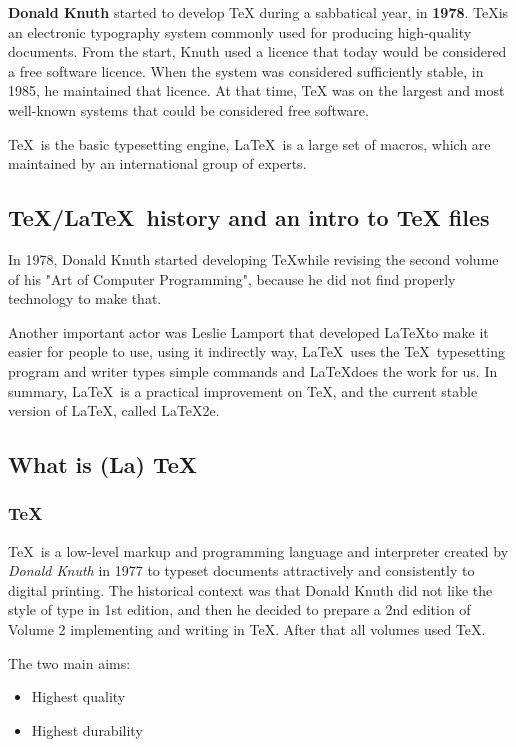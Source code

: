 \documentclass[11pt]{article}
\begin{document}
\textbf{Donald Knuth} started to develop TeX during a sabbatical year, in \textbf{1978}. \TeX is an electronic typography system commonly used for producing high-quality documents. From the start, Knuth used a licence that today would be considered a free software licence. When the system was considered sufficiently stable, in 1985, he maintained that licence. At that time, TeX was on the largest and most well-known systems that could be considered free software.

\TeX\ is the basic typesetting engine, \LaTeX\ is a large set of macros, which are maintained by an international group of experts.

\subsection{\TeX/\LaTeX\ history and an intro to TeX files}
In 1978, Donald Knuth started developing \TeX while revising the second volume of his "Art of Computer Programming", because he did not find properly technology to make that.

Another important actor was Leslie Lamport that developed \LaTeX to make it easier for people to use, using it indirectly way, \LaTeX\ uses the \TeX\ typesetting program and writer types simple commands and \LaTeX does the work for us. In summary, \LaTeX\ is a practical improvement on \TeX, and the current stable version of \LaTeX, called \LaTeX2e.

\subsection{What is (La) \TeX\ }
\subsubsection{\TeX\ }
\TeX\ is a low-level markup and programming language and interpreter created by \emph{Donald Knuth} in 1977 to typeset documents attractively and consistently to digital printing. The historical context was that Donald Knuth did not like the style of type in 1st edition, and then he decided to prepare a 2nd edition of Volume 2 implementing and writing in \TeX. After that all volumes used \TeX. 

The two main aims:
\begin{itemize}
  \item Highest quality
  \item Highest durability
\end{itemize}
\end{document}
